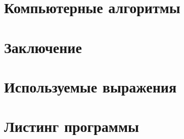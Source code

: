 \documentclass[a4paper,14pt]{extarticle}
\begin{document}
\section{Компьютерные алгоритмы}


\section*{\centering Заключение}


\printbibliography

\begin{appendices}
\renewcommand{\thesection}{\arabic{section}}

\section{Используемые выражения}


\section{Листинг программы}


\end{appendices}
\end{document}
